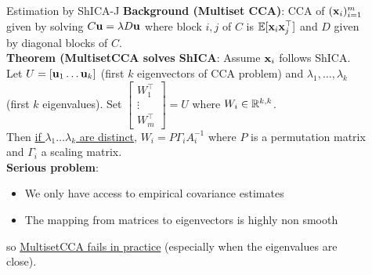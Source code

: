 \documentclass[final]{beamer}
\newlength{\sepwid}
\newlength{\onecolwid}
\newlength{\onecolwidone}
\newlength{\onecolwidtwo}
\begin{document}
\begin{frame}[t]
\begin{columns}[t]
\begin{column}{\onecolwidone}




\end{column} %

\begin{column}{\sepwid}\end{column} %

\begin{column}{\onecolwidtwo} %

  \begin{block}{Estimation by ShICA-J}
    \textbf{Background (Multiset CCA)}: CCA of $(\mathbf{x}_i)_{i=1}^m$ given by solving
    $C \mathbf{u} = \lambda D \mathbf{u}$ where block $i, j$ of $C$ is $\mathbb{E}[\mathbf{x}_i \mathbf{x}_j^{\top}]$
    and $D$ given by diagonal blocks of $C$. \\
    \vspace{0.5em}
    \textbf{Theorem (MultisetCCA solves ShICA}: Assume $\mathbf{x}_i$ follows ShICA. 
    Let $U = [\mathbf{u}_1 \dots \mathbf{u}_k]$ (first $k$ eigenvectors of CCA problem) and
    $\lambda_1, \dots, \lambda_k$ (first $k$ eigenvalues). Set $\begin{bmatrix} W_1^{\top} \\ \vdots \\
      W_m^{\top} \end{bmatrix} = U$ where $W_i \in \mathbb{R}^{k, k}$.  \\
    Then \underline{if $\lambda_1 \dots \lambda_k$ are distinct}, $W_i = P \Gamma_i A_i^{-1}$ where $P$ is a permutation matrix and
    $\Gamma_i$ a scaling matrix.   \\

    \vspace{0.5em}
    \textbf{Serious problem}:
    \begin{itemize}
      \item We only have access to empirical covariance
        estimates
      \item The mapping from matrices to eigenvectors is highly non smooth
    \end{itemize}
    so \underline{MultisetCCA fails in practice} (especially when the
    eigenvalues are close). \\


\end{block}
\end{column}
\end{columns}
\end{frame}
\end{document}
